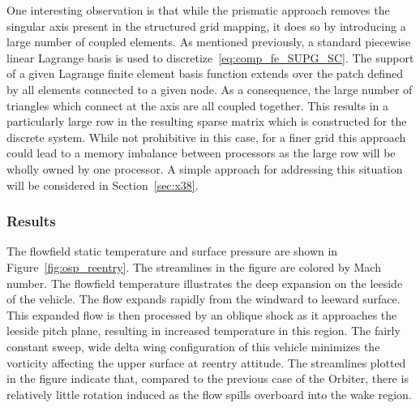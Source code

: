 One interesting observation is that while the prismatic approach removes the singular axis present in the structured grid mapping, it does so by introducing a large number of coupled elements.  As mentioned previously, a standard piecewise linear Lagrange basis is used to discretize~\eqref{eq:comp_fe_SUPG_SC}. The support of a given Lagrange finite element basis function extends over the patch defined by all elements connected to a given node.  As a consequence, the large number of triangles which connect at the axis are all coupled together.  This results in a particularly large row in the resulting sparse matrix which is constructed for the discrete system.  While not prohibitive in this case, for a finer grid this approach could lead to a memory imbalance between processors as the large row will be wholly owned by one processor.  A simple approach for addressing this situation will be considered in Section~\ref{sec:x38}.



\subsubsection{Results}
The flowfield static temperature and surface pressure are shown in Figure~\ref{fig:osp_reentry}.  The streamlines in the figure are colored by Mach number.  The flowfield temperature illustrates the deep expansion on the leeside of the vehicle. The flow expands rapidly from the windward to leeward surface.  This expanded flow is  then processed by an oblique shock as it approaches the leeside pitch plane, resulting in increased temperature in this region.  The fairly constant sweep, wide delta wing configuration of this vehicle minimizes the vorticity affecting the upper surface at reentry attitude.  The streamlines plotted in the figure indicate that, compared to the previous case of the Orbiter, there is relatively little rotation induced as the flow spills overboard into the wake region.

